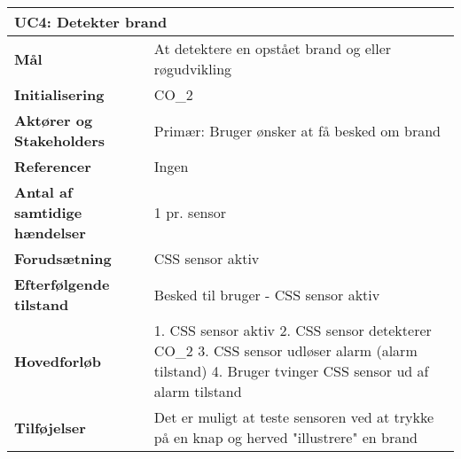 \begin{table}[H] \centering
\begin{tabular}{|p{6cm}|p{8cm}|}
	\hline
\multicolumn{2}{|l|}{\textbf{UC4: Detekter brand}} \\\hline
\textbf{Mål}								&At detektere en opstået brand og eller røgudvikling \\\hline
\textbf{Initialisering}					& CO_2 \\\hline
\textbf{Aktører og Stakeholders}			&Primær: Bruger ønsker at få besked om brand \\\hline
\textbf{Referencer}						& Ingen \\\hline
\textbf{Antal af samtidige hændelser}	& 1 pr. sensor \\\hline
\textbf{Forudsætning}					& CSS sensor aktiv  \\\hline
\textbf{Efterfølgende tilstand}			& Besked til bruger - CSS sensor aktiv \\\hline
\textbf{Hovedforløb}						

&   1. CSS sensor aktiv
	2. CSS sensor detekterer CO_2 
	3. CSS sensor udløser alarm (alarm tilstand)
	4. Bruger tvinger CSS sensor ud af alarm tilstand \\\hline
\textbf{Tilføjelser}						& Det er muligt at teste sensoren ved at trykke på en knap og herved "illustrere" en brand  \\\hline
	\end{tabular}
	\label{UC4} 
\end{table}